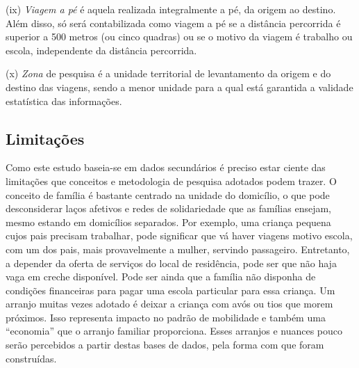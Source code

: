 \begin{compactitem}[]
\item (ix) \emph{Viagem a pé} é aquela realizada integralmente a pé, da origem ao destino. Além disso, só será contabilizada como viagem a pé se a distância percorrida é superior a 500 metros (ou cinco quadras) ou se o motivo da viagem é trabalho ou escola, independente da distância percorrida.

\item (x) \emph{Zona} de pesquisa é a unidade territorial de levantamento da origem e do destino das viagens, sendo a menor unidade para a qual está garantida a validade estatística das informações.
\end{compactitem}

\subsection{Limitações}\label{subsec:limitacoes}

Como este estudo baseia-se em dados secundários é preciso estar ciente das limitações que conceitos e metodologia de pesquisa adotados podem trazer. O conceito de família é bastante centrado na unidade do domicílio, o que pode desconsiderar laços afetivos e redes de solidariedade que as famílias ensejam, mesmo estando em domicílios separados. Por exemplo, uma criança pequena cujos pais precisam trabalhar, pode significar que vá haver viagens motivo escola, com um dos pais, mais provavelmente a mulher, servindo passageiro. Entretanto, a depender da oferta de serviços do local de residência, pode ser que não haja vaga em creche disponível. Pode ser ainda que a família não disponha de  condições financeiras para pagar uma escola particular para essa criança. Um arranjo muitas vezes adotado é deixar a criança com avós ou tios que morem próximos. Isso representa impacto no padrão de mobilidade e também uma ``economia'' que o arranjo familiar proporciona. Esses arranjos e nuances pouco serão percebidos a partir destas bases de dados, pela forma com que foram construídas.

